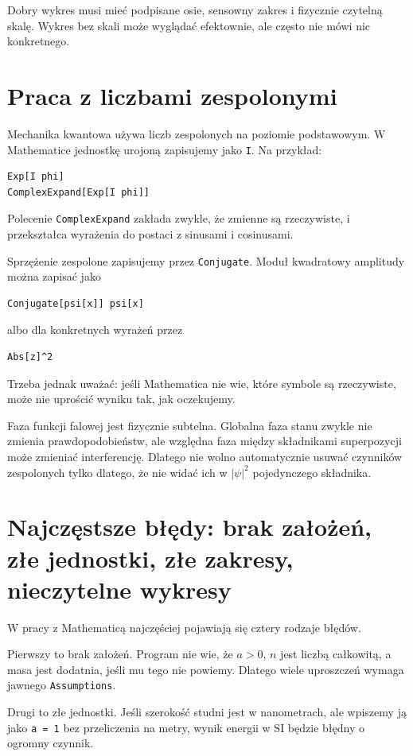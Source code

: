 Dobry wykres musi mieć podpisane osie, sensowny zakres i fizycznie czytelną skalę. Wykres bez skali może wyglądać efektownie, ale często nie mówi nic konkretnego.

\section{Praca z liczbami zespolonymi}

Mechanika kwantowa używa liczb zespolonych na poziomie podstawowym. W Mathematice jednostkę urojoną zapisujemy jako \texttt{I}. Na przykład:
\begin{verbatim}
Exp[I phi]
ComplexExpand[Exp[I phi]]
\end{verbatim}
Polecenie \texttt{ComplexExpand} zakłada zwykle, że zmienne są rzeczywiste, i przekształca wyrażenia do postaci z sinusami i cosinusami.

Sprzężenie zespolone zapisujemy przez \texttt{Conjugate}. Moduł kwadratowy amplitudy można zapisać jako
\begin{verbatim}
Conjugate[psi[x]] psi[x]
\end{verbatim}
albo dla konkretnych wyrażeń przez
\begin{verbatim}
Abs[z]^2
\end{verbatim}
Trzeba jednak uważać: jeśli Mathematica nie wie, które symbole są rzeczywiste, może nie uprościć wyniku tak, jak oczekujemy.

Faza funkcji falowej jest fizycznie subtelna. Globalna faza stanu zwykle nie zmienia prawdopodobieństw, ale względna faza między składnikami superpozycji może zmieniać interferencję. Dlatego nie wolno automatycznie usuwać czynników zespolonych tylko dlatego, że nie widać ich w \(|\psi|^2\) pojedynczego składnika.

\section{Najczęstsze błędy: brak założeń, złe jednostki, złe zakresy, nieczytelne wykresy}

W pracy z Mathematicą najczęściej pojawiają się cztery rodzaje błędów.

Pierwszy to brak założeń. Program nie wie, że \(a>0\), \(n\) jest liczbą całkowitą, a masa jest dodatnia, jeśli mu tego nie powiemy. Dlatego wiele uproszczeń wymaga jawnego \texttt{Assumptions}.

Drugi to złe jednostki. Jeśli szerokość studni jest w nanometrach, ale wpiszemy ją jako \texttt{a = 1} bez przeliczenia na metry, wynik energii w SI będzie błędny o ogromny czynnik.

